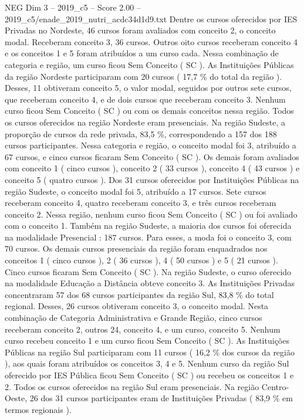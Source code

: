 \begin{textsample}{NEG Dim 3 – 2019\_c5 – Score 2.00 – 2019\_c5/enade\_2019\_nutri\_acdc34d1d9.txt}
Dentre os cursos oferecidos por IES Privadas no Nordeste, 46 cursos foram avaliados com conceito 2, o conceito modal.
Receberam conceito 3, 36 cursos.
Outros oito cursos receberam conceito 4 e os conceitos 1 e 5 foram atribuídos a um curso cada.
Nessa combinação de categoria e região, um curso ficou Sem Conceito ( SC ).
As Instituições Públicas da região Nordeste participaram com 20 cursos ( 17,7 \% do total da região ).
Desses, 11 obtiveram conceito 5, o valor modal, seguidos por outros sete cursos, que receberam conceito 4, e de dois cursos que receberam conceito 3.
Nenhum curso ficou Sem Conceito ( SC ) ou com os demais conceitos nessa região.
Todos os cursos oferecidos na região Nordeste eram presenciais.
Na região Sudeste, a proporção de cursos da rede privada, 83,5 \%, correspondendo a 157 dos 188 cursos participantes.
Nessa categoria e região, o conceito modal foi 3, atribuído a 67 cursos, e cinco cursos ficaram Sem Conceito ( SC ).
Os demais foram avaliados com conceito 1 ( cinco cursos ), conceito 2 ( 33 cursos ), conceito 4 ( 43 cursos ) e conceito 5 ( quatro cursos ).
Dos 31 cursos oferecidos por Instituições Públicas na região Sudeste, o conceito modal foi 5, atribuído a 17 cursos.
Sete cursos receberam conceito 4, quatro receberam conceito 3, e três cursos receberam conceito 2.
Nessa região, nenhum curso ficou Sem Conceito ( SC ) ou foi avaliado com o conceito 1.
Também na região Sudeste, a maioria dos cursos foi oferecida na modalidade Presencial : 187 cursos.
Para esses, a moda foi o conceito 3, com 70 cursos.
Os demais cursos presenciais da região foram enquadrados nos conceitos 1 ( cinco cursos ), 2 ( 36 cursos ), 4 ( 50 cursos ) e 5 ( 21 cursos ).
Cinco cursos ficaram Sem Conceito ( SC ).
Na região Sudeste, o curso oferecido na modalidade Educação a Distância obteve conceito 3.
As Instituições Privadas concentraram 57 dos 68 cursos participantes da região Sul, 83,8 \% do total regional.
Desses, 26 cursos obtiveram conceito 3, o conceito modal.
Nesta combinação de Categoria Administrativa e Grande Região, cinco cursos receberam conceito 2, outros 24, conceito 4, e um curso, conceito 5.
Nenhum curso recebeu conceito 1 e um curso ficou Sem Conceito ( SC ).
As Instituições Públicas na região Sul participaram com 11 cursos ( 16,2 \% dos cursos da região ), aos quais foram atribuídos os conceitos 3, 4 e 5.
Nenhum curso da região Sul oferecido por IES Pública ficou Sem Conceito ( SC ) ou recebeu os conceitos 1 e 2.
Todos os cursos oferecidos na região Sul eram presenciais.
Na região Centro-Oeste, 26 dos 31 cursos participantes eram de Instituições Privadas ( 83,9 \% em termos regionais ).

\end{textsample}
